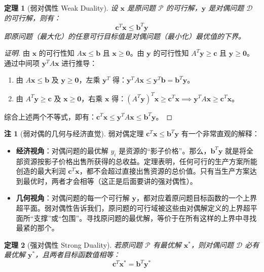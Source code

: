\documentclass[12pt]{article}
\theoremstyle{plain}
\newtheorem{thm}{定理}[subsection]
\theoremstyle{definition}
\newtheorem{rmk}{注}[subsection]
\newenvironment{prf}[1][证明]{\begin{proof}[#1]}{\end{proof}}
\begin{document}
\begin{thm}[弱对偶性 Weak Duality]
    设 $\bm{x}$ 是原问题 $\mathcal{P}$ 的可行解，$\bm{y}$ 是对偶问题 $\mathcal{D}$ 的可行解，则有：
    \[ \bm{c}^T \bm{x} \leq \bm{b}^T \bm{y} \]
    即原问题（最大化）的任意可行目标值是对偶问题（最小化）最优值的下界。
\end{thm}
\begin{prf}
    由 $\bm{x}$ 的可行性知 $A\bm{x} \leq \bm{b}$ 且 $\bm{x} \geq \bm{0}$。由 $\bm{y}$ 的可行性知 $A^T \bm{y} \geq \bm{c}$ 且 $\bm{y} \geq \bm{0}$。
    通过中间项 $\bm{y}^T A \bm{x}$ 进行推导：
    \begin{enumerate}
        \item 由 $A\bm{x} \leq \bm{b}$ 及 $\bm{y} \geq \bm{0}$，左乘 $\bm{y}^T$ 得：$\bm{y}^T A \bm{x} \leq \bm{y}^T \bm{b} = \bm{b}^T \bm{y}$。
        \item 由 $A^T \bm{y} \geq \bm{c}$ 及 $\bm{x} \geq \bm{0}$，右乘 $\bm{x}$ 得：$(A^T \bm{y})^T \bm{x} \geq \bm{c}^T \bm{x} \implies \bm{y}^T A \bm{x} \geq \bm{c}^T \bm{x}$。
    \end{enumerate}
    综合上述两个不等式，即有：$\bm{c}^T \bm{x} \leq \bm{y}^T A \bm{x} \leq \bm{b}^T \bm{y}$。
\end{prf}

\begin{rmk}[弱对偶的几何与经济直觉]
    弱对偶定理 $ \bm{c}^T \bm{x} \leq \bm{b}^T \bm{y} $ 有一个非常直观的解释：
    \begin{itemize}
        \item \textbf{经济视角}：对偶问题的最优解 $y_i$ 是资源的“影子价格”。那么，$\bm{b}^T \bm{y}$ 就是将全部资源按影子价格出售所获得的总收益。定理表明，任何可行的生产方案所能创造的最大利润 $\bm{c}^T \bm{x}$，都不会超过直接出售资源的总价值。只有当生产方案达到最优时，两者才会相等（这正是后面要讲的强对偶性）。
        \item \textbf{几何视角}：对偶问题的每一个可行解 $\bm{y}$，都对应着原问题目标函数的一个上界超平面。弱对偶性告诉我们，原问题的可行域被这些由对偶解定义的上界超平面所“支撑”或“包围”。寻找原问题的最优解，等价于在所有这样的上界中寻找最紧的那个。
    \end{itemize}
\end{rmk}

\begin{thm}[强对偶性 Strong Duality]
    若原问题 $\mathcal{P}$ 有最优解 $\bm{x}^*$，则对偶问题 $\mathcal{D}$ 必有最优解 $\bm{y}^*$，且两者目标函数值相等：
    \[ \bm{c}^T \bm{x}^* = \bm{b}^T \bm{y}^* \]
\end{thm}
\end{document}
